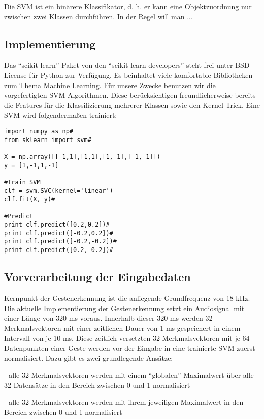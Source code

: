 Die SVM ist ein binärere Klassifikator, d. h. er kann eine Objektzuordnung nur zwischen zwei Klassen durchführen. 
In der Regel will man ...


\newpage

\subsection{Implementierung}

Das “scikit-learn”-Paket von den “scikit-learn developers” steht frei unter BSD License für Python zur Verfügung. 
Es beinhaltet viele komfortable Bibliotheken zum Thema Machine Learning. 
Für unsere Zwecke benutzen wir die vorgefertigten SVM-Algorithmen. 
Diese berücksichtigen freundlicherweise bereits die Features für die Klassifizierung mehrerer Klassen sowie den Kernel-Trick. Eine SVM wird folgendermaßen trainiert:

\begin{lstlisting}
import numpy as np#
from sklearn import svm#

X = np.array([[-1,1],[1,1],[1,-1],[-1,-1]])
y = [1,-1,1,-1]

#Train SVM
clf = svm.SVC(kernel='linear')
clf.fit(X, y)#

#Predict
print clf.predict([0.2,0.2])#
print clf.predict([-0.2,0.2])#
print clf.predict([-0.2,-0.2])#
print clf.predict([0.2,-0.2])#
\end{lstlisting}


\subsection{Vorverarbeitung der Eingabedaten}

Kernpunkt der Gestenerkennung ist die anliegende Grundfrequenz von 18 kHz. 
Die aktuelle Implementierung der Gestenerkennung setzt ein Audiosignal mit einer Länge von 320 ms voraus. 
Innerhalb dieser 320 ms werden 32 Merkmalsvektoren mit einer zeitlichen Dauer von 1 ms gespeichert in einem Intervall von je 10 ms. 
Diese zeitlich versetzten 32 Merkmalsvektoren mit je 64 Datenpunkten einer Geste werden vor der Eingabe in eine trainierte SVM zuerst normalisiert. 
Dazu gibt es zwei grundlegende Ansätze:

- alle 32 Merkmalsvektoren werden mit einem “globalen” Maximalwert über alle 32 Datensätze in den Bereich zwischen 0 und 1 normalisiert\newline

- alle 32 Merkmalsvektoren werden mit ihrem jeweiligen Maximalwert in den Bereich zwischen 0 und 1 normalisiert


